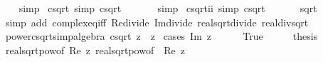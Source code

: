 \begin{isabellebody}
%
\isadelimproof
\ \ %
\endisadelimproof
%
\isatagproof
{}\isamarkupfalse%
\ simp%
\endisatagproof
{\isafoldproof}%
%
\isadelimproof
\isanewline
%
\endisadelimproof
\isanewline
{}\isamarkupfalse%
\ csqrt{\isacharunderscore}{\kern0pt}{}\ {\isacharbrackleft}{\kern0pt}simp{\isacharbrackright}{\kern0pt}{\isacharcolon}{\kern0pt}\ {\isachardoublequoteopen}csqrt\ {}\ {\isacharequal}{\kern0pt}\ {}{\isachardoublequoteclose}\isanewline
%
\isadelimproof
\ \ %
\endisadelimproof
%
\isatagproof
{}\isamarkupfalse%
\ simp%
\endisatagproof
{\isafoldproof}%
%
\isadelimproof
\isanewline
%
\endisadelimproof
\isanewline
{}\isamarkupfalse%
\ csqrt{\isacharunderscore}{\kern0pt}ii\ {\isacharbrackleft}{\kern0pt}simp{\isacharbrackright}{\kern0pt}{\isacharcolon}{\kern0pt}\ {\isachardoublequoteopen}csqrt\ {\isasymi}\ {\isacharequal}{\kern0pt}\ {\isacharparenleft}{\kern0pt}{}\ {\isacharplus}{\kern0pt}\ {\isasymi}{\isacharparenright}{\kern0pt}\ {\isacharslash}{\kern0pt}\ sqrt\ {}{\isachardoublequoteclose}\isanewline
%
\isadelimproof
\ \ %
\endisadelimproof
%
\isatagproof
{}\isamarkupfalse%
\ {\isacharparenleft}{\kern0pt}simp\ add{\isacharcolon}{\kern0pt}\ complex{\isacharunderscore}{\kern0pt}eq{\isacharunderscore}{\kern0pt}iff\ Re{\isacharunderscore}{\kern0pt}divide\ Im{\isacharunderscore}{\kern0pt}divide\ real{\isacharunderscore}{\kern0pt}sqrt{\isacharunderscore}{\kern0pt}divide\ real{\isacharunderscore}{\kern0pt}div{\isacharunderscore}{\kern0pt}sqrt{\isacharparenright}{\kern0pt}%
\endisatagproof
{\isafoldproof}%
%
\isadelimproof
\isanewline
%
\endisadelimproof
\isanewline
{}\isamarkupfalse%
\ power{}{\isacharunderscore}{\kern0pt}csqrt{\isacharbrackleft}{\kern0pt}simp{\isacharcomma}{\kern0pt}algebra{\isacharbrackright}{\kern0pt}{\isacharcolon}{\kern0pt}\ {\isachardoublequoteopen}{\isacharparenleft}{\kern0pt}csqrt\ z{\isacharparenright}{\kern0pt}\ {\isacharequal}{\kern0pt}\ z{\isachardoublequoteclose}\isanewline
%
\isadelimproof
%
\endisadelimproof
%
\isatagproof
{}\isamarkupfalse%
\ {\isacharparenleft}{\kern0pt}cases\ {\isachardoublequoteopen}Im\ z\ {\isacharequal}{\kern0pt}\ {}{\isachardoublequoteclose}{\isacharparenright}{\kern0pt}\isanewline
\ \ \isamarkupfalse%
\ True\isanewline
\ \ \isamarkupfalse%
\ \isamarkupfalse%
\ {\isacharquery}{\kern0pt}thesis\isanewline
\ \ \ \ \isamarkupfalse%
\ real{\isacharunderscore}{\kern0pt}sqrt{\isacharunderscore}{\kern0pt}pow{}{\isacharbrackleft}{\kern0pt}of\ {\isachardoublequoteopen}Re\ z{\isachardoublequoteclose}{\isacharbrackright}{\kern0pt}\ real{\isacharunderscore}{\kern0pt}sqrt{\isacharunderscore}{\kern0pt}pow{}{\isacharbrackleft}{\kern0pt}of\ {\isachardoublequoteopen}{\isacharminus}{\kern0pt}\ Re\ z{\isachardoublequoteclose}{\isacharbrackright}{\kern0pt}\isanewline

\end{isabellebody}
